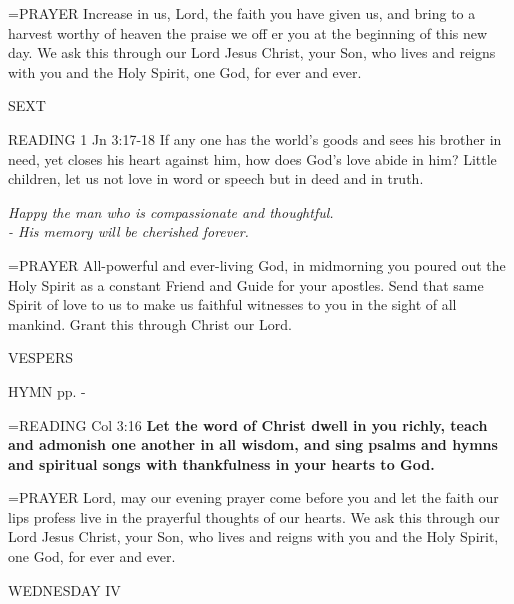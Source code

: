 \hangindent=\parindent \small{PRAYER  Increase in us, Lord, the faith you have given us, and bring to a harvest worthy of heaven the praise we off er you at the beginning of this new day. We ask this through our Lord Jesus Christ, your Son, who lives and reigns with you and the Holy Spirit, one God, for ever and ever.}

\begin{flushleft}\normalsize SEXT\\\end{flushleft}

READING 1 Jn 3:17-18 If any one has the world’s goods and sees his brother in need, yet closes his heart against him, how does God’s love abide in him? Little children, let us not love in word or speech but in deed and in truth.

\begin{center}
\textit{Happy the man who is compassionate and thoughtful.\\
- His memory will be cherished forever.}
\end{center}

\hangindent=\parindent \small{PRAYER  All-powerful and ever-living God, in midmorning you poured out the Holy Spirit as a constant Friend and Guide for your apostles.  Send that same Spirit of love to us to make us faithful witnesses to you in the sight of all mankind. Grant this through Christ our Lord.}

\begin{flushleft}\normalsize VESPERS\\\end{flushleft}

HYMN pp. \pageref{ordinaryTime:fourthHymn} - \pageref{ordinaryTime:sixthHymn}

\hangindent=\parindent \small{READING} Col 3:16 \textbf{Let the word of Christ dwell in you richly, teach and admonish one another in all wisdom, and sing psalms and hymns and spiritual songs with thankfulness in your hearts to God.\\}

\hangindent=\parindent \small{PRAYER  Lord, may our evening prayer come before you and let the faith our lips profess live in the prayerful thoughts of our hearts.  We ask this through our Lord Jesus Christ, your Son, who lives and reigns with you and the Holy Spirit, one God, for ever and ever.}

\begin{center}
\normalsize WEDNESDAY IV
\end{center}

